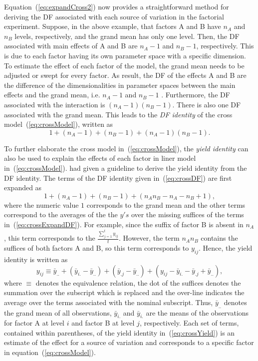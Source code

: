 \documentclass[11pt,a4paper]{article}
\begin{document}
Equation~(\ref{eq:expandCross2}) now provides a straightforward method for deriving the DF associated with each source of variation in the factorial experiment. Suppose, in the above example, that factors A and B have $n_A$ and $n_B$ levels, respectively, and the grand mean has only one level. Then, the DF associated with main effects of A and B are $n_A - 1$ and $n_B - 1$, respectively. This is due to each factor having its own parameter space with a specific dimension. To estimate the effect of each factor of the model, the grand mean needs to be adjusted or swept for every factor. As result, the DF of the effects A and B are the difference of the dimensionalities in parameter spaces between the main effects and the grand mean, i.e. $n_A - 1$ and $n_B - 1$ \citep{Good1973}. Furthermore, the DF associated with the interaction is $(n_A - 1)(n_B - 1)$. There is also one DF associated with the grand mean. This leads to the \emph{DF identity} of the cross model~(\ref{eq:crossModel}), written as 
\begin{equation}\label{eq:crossDF}
1 + (n_A - 1) + (n_B - 1) + (n_A - 1)(n_B - 1).
\end{equation} 

To further elaborate the cross model in~(\ref{eq:crossModel}), the \emph{yield identity} can also be used to explain the effects of each factor in liner model in~(\ref{eq:crossModel}). \cite{Nelder1965A} had given a guideline to derive the yield identity from the DF identity. The terms of the DF identity given in~(\ref{eq:crossDF}) are first expanded as
\begin{equation}\label{eq:crossExpandDF}
1 + (n_A - 1) + (n_B - 1) + (n_A n_B - n_A - n_B + 1),
\end{equation} 
where the numeric value $1$ corresponds to the grand mean and the other terms correspond to the averages of the the $y's$ over the missing suffices of the terms in~(\ref{eq:crossExpandDF}). For example, since the suffix of factor B is absent in $n_A$, this term corresponds to the $\displaystyle \frac{\sum_{j=1}^t y_{ij}}{t}$. However, the term $n_A n_B$ contains the suffices of both factors A and B, so this term corresponds to $y_{ij}$. Hence, the yield identity is written as
\begin{equation}\label{eq:crossYield}
y_{ij} \equiv \bar{y}_{..} + (\bar{y}_{i.} - \bar{y}_{..}) + (\bar{y}_{.j} - \bar{y}_{..}) +(y_{ij} - \bar{y}_{i.} - \bar{y}_{.j} + \bar{y}_{..}),
\end{equation}
where $\equiv$ denotes the equivalence relation, the dot of the suffices denotes the summation over the subscript which is replaced and the over-line indicates the average over the terms associated with the nominal subscript. Thus, $\bar{y}_{..}$ denotes the grand mean of all observations, $\bar{y}_{i.}$ and $\bar{y}_{i.}$ are the means of the observations for factor A at level $i$ and factor B at level $j$, respectively. Each set of terms, contained within parentheses, of the yield identity in~(\ref{eq:crossYield}) is an estimate of the effect for a source of variation and corresponds to a specific factor in equation~(\ref{eq:crossModel}).
\end{document}
